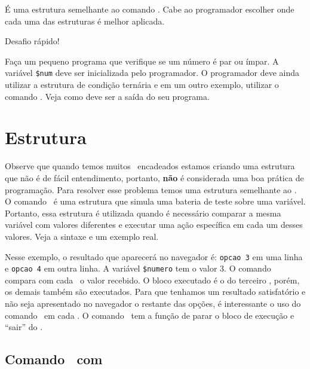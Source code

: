É uma estrutura semelhante ao comando \comandoifelse. Cabe ao programador escolher onde
cada uma das estruturas é melhor aplicada.

{\Large Desafio rápido!}

Faça um pequeno programa que verifique se um número é par ou ímpar. A variável
\texttt{\$num} deve ser inicializada pelo programador. O programador deve ainda
utilizar a estrutura de condição ternária e em um outro exemplo, utilizar o comando
\comandoifelse. Veja como deve ser a saída do seu programa. 


\section{Estrutura \comandoswitch}
\label{estrutura-switch}

Observe que quando temos muitos \comandoifelse~encadeados estamos criando uma estrutura 
que não é de fácil entendimento, portanto, \textbf{não} é considerada uma boa prática de 
programação. Para resolver esse problema temos uma estrutura semelhante ao \comandoifelse. 
O comando \comandoswitch~é uma estrutura que simula uma bateria de teste sobre uma variável. 
Portanto, essa estrutura é utilizada quando é  necessário comparar a mesma variável 
com valores diferentes e executar uma ação específica em cada um desses valores. Veja
a sintaxe e um exemplo real.



Nesse exemplo, o resultado que aparecerá no navegador é: \texttt{opcao 3} em uma linha e \texttt{opcao 4}
em outra linha. A variável \texttt{\$numero} tem o valor 3.  O comando \comandoswitch~
compara com cada \comandocase~o valor recebido. O bloco executado é o do terceiro \comandocase, 
porém, os demais também são executados. Para que tenhamos um resultado satisfatório e não seja
apresentado no navegador o restante das opções, é interessante o uso do comando \comandobreak~em 
cada \comandocase. O comando \comandobreak~tem a função de parar o bloco de execução e ``sair''
do \comandoswitch.

\subsection{Comando \comandoswitch~com \comandobreak}
\label{comando-switch-com-break}

